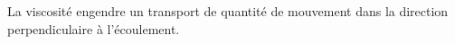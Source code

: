 \documentclass[12pt,fancy]{cours}
\begin{document}


\begin{prop}\label{prop:}
La viscosité engendre un transport  de quantité de mouvement dans la direction perpendiculaire à l'écoulement.
\end{prop}







\end{document}
